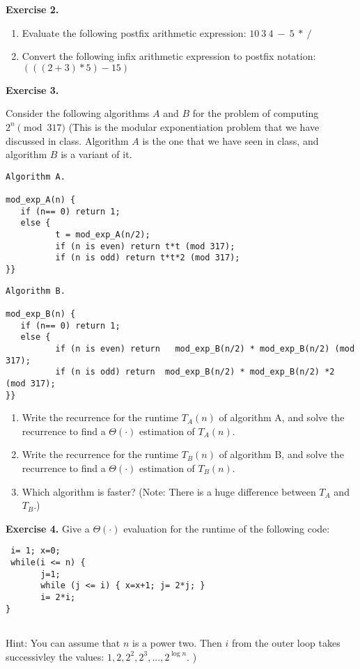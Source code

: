\documentclass[11pt]{article}
\begin{document}
\bigskip

\textbf{Exercise 2.}  
\begin{enumerate}
\item Evaluate the following postfix arithmetic expression:  $10~3~4~-~5~*~/$
\item Convert the following infix arithmetic expression to postfix notation: $(((2+3)*5)-15)$

\end{enumerate}

\bigskip

\textbf{Exercise 3.}

Consider the following algorithms $A$ and $B$ for the problem of computing $2^n \pmod{ 317}$ (This is the modular exponentiation problem that we  have discussed in class. Algorithm $A$ is the one that we have seen in class, and algorithm $B$ is a variant of it.

\begin{verbatim}
Algorithm A.

mod_exp_A(n) {
   if (n== 0) return 1;
   else {
          t = mod_exp_A(n/2);  
          if (n is even) return t*t (mod 317);
          if (n is odd) return t*t*2 (mod 317);
}}
\end{verbatim}


\begin{verbatim}
Algorithm B.

mod_exp_B(n) {
   if (n== 0) return 1;
   else {
          if (n is even) return   mod_exp_B(n/2) * mod_exp_B(n/2) (mod 317);
          if (n is odd) return  mod_exp_B(n/2) * mod_exp_B(n/2) *2 (mod 317);
}}
\end{verbatim}

\begin{enumerate}
\item Write the recurrence for the runtime $T_A(n)$ of algorithm A, and solve the recurrence to find a $\Theta( \cdot)$ estimation of $T_A(n)$.
\item Write the recurrence for the runtime $T_B(n)$ of algorithm B, and solve the recurrence to find a $\Theta( \cdot)$ estimation of $T_B(n)$.
\item Which algorithm is faster? (Note: There is a huge difference between $T_A$ and $T_B$.)
\end{enumerate}
\bigskip

\textbf{Exercise 4.}
Give a  $\Theta( \cdot)$ evaluation for the runtime of the following code:
\begin{verbatim}
 i= 1; x=0;
 while(i <= n) {
       j=1;
       while (j <= i) { x=x+1; j= 2*j; }
       i= 2*i;
}    


\end{verbatim}
Hint:  You can assume that $n$ is a power two.  Then $i$ from the outer loop takes successivley the values: $1, 2, 2^2, 2^3, ..., 2^{\log n}$. )
\newpage
\end{document}

